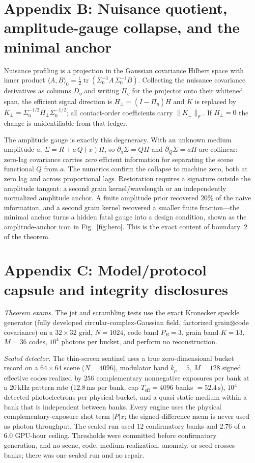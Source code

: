 \documentclass[aps,prl,reprint,groupedaddress,superscriptaddress,floatfix]{revtex4-2}
\newcommand{\tr}{\operatorname{tr}}
\begin{document}
\section*{Appendix B: Nuisance quotient, amplitude-gauge collapse, and the minimal anchor}
Nuisance profiling is a projection in the Gaussian covariance Hilbert space with
inner product $\langle A,B\rangle_0=\tfrac12\tr(\Sigma_0^{-1}A\,\Sigma_0^{-1}B)$.
Collecting the nuisance covariance derivatives as columns $D_\eta$ and writing
$\Pi_\eta$ for the projector onto their whitened span, the efficient signal
direction is $H_\perp=(I-\Pi_\eta)H$ and $K$ is replaced by
$K_\perp=\Sigma_0^{-1/2}H_\perp\Sigma_0^{-1/2}$; all contact-order coefficients
carry $\|K_\perp\|_F$. If $H_\perp=0$ the change is unidentifiable from that
ledger.

The amplitude gauge is exactly this degeneracy. With an unknown medium amplitude
$a$, $\Sigma=R+a\,Q(x)H$, so $\partial_a\Sigma=QH$ and $\partial_Q\Sigma=aH$ are
collinear: zero-lag covariance carries \emph{zero} efficient information for
separating the scene functional $Q$ from $a$. The numerics confirm the collapse
to machine zero, both at zero lag and across proportional lags. Restoration
requires a signature outside the amplitude tangent: a second grain
kernel/wavelength or an independently normalized amplitude anchor. A finite
amplitude prior recovered $20\%$ of the naive information, and a second grain
kernel recovered a smaller finite fraction---the minimal anchor turns a hidden
fatal gauge into a design condition, shown as the amplitude-anchor icon in
Fig.~\ref{fig:hero}. This is the exact content of boundary~2 of the theorem.

\section*{Appendix C: Model/protocol capsule and integrity disclosures}
\emph{Theorem exams.} The jet and scrambling tests use the exact Kronecker
speckle generator (fully developed circular-complex-Gaussian field, factorized
grain$\otimes$code covariance) on a $32\times32$ grid, $N=1024$, code band
$P_B=3$, grain band $K=13$, $M=36$ codes, $10^4$ photons per bucket, and perform
no reconstruction.

\emph{Sealed detector.} The thin-screen sentinel uses a true zero-dimensional
bucket record on a $64\times64$ scene ($N=4096$), modulator band $k_p=5$, $M=128$
signed effective codes realized by $256$ complementary nonnegative exposures per
bank at a $20\,\mathrm{kHz}$ pattern rate ($12.8\,\mathrm{ms}$ per bank, cap
$T_{\mathrm{eff}}=4096$ banks $=52.4\,\mathrm{s}$), $10^4$ detected
photoelectrons per physical bucket, and a quasi-static medium within a bank that
is independent between banks. Every engine uses the physical
complementary-exposure shot term $|P|x$; the signed-difference mean is never used
as photon throughput. The sealed run used $12$ confirmatory banks and
$2.76$ of a $6.0$ GPU-hour ceiling. Thresholds were committed before confirmatory
generation, and no scene, code, medium realization, anomaly, or seed crosses
banks; there was one sealed run and no repair.
\end{document}
